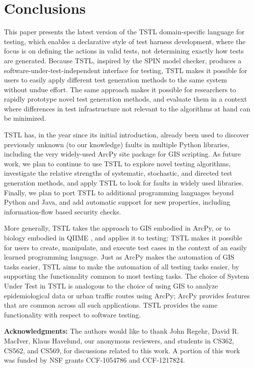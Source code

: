 \section{Conclusions}
\label{sec:conclusion}

This paper presents the latest version of the TSTL
\cite{NFM15,ISSTA15,tstl} domain-specific language for testing, which
enables a declarative style of test harness development, where the
focus is on defining the actions in valid tests, not determining
exactly how tests are generated.  Because TSTL, inspired by the SPIN
model checker, produces a software-under-test-independent interface
for testing, TSTL makes it possible for users to easily apply
different test generation methods to the same system without undue
effort.  The same approach makes it possible for researchers to rapidly prototype novel test generation
methods, and evaluate them in a context where differences in test
infrastructure not relevant to the algorithms at hand can be minimized.

TSTL has, in the year since its initial introduction,
already been used to discover previously unknown (to our knowledge)
faults in multiple Python libraries, including the very widely-used
ArcPy site package for GIS scripting. 
As future work, we plan to continue to use TSTL to explore novel
testing algorithms, investigate the relative strengths of systematic,
stochastic, and directed test generation methods, and apply TSTL to
look for faults in widely used libraries.  Finally, we plan to
port TSTL to additional
programming languages beyond Python and Java, and add automatic
support for new properties, including
information-flow based security checks.

More generally, TSTL takes the approach to GIS embodied in ArcPy, or
to biology embodied in QIIME \cite{QIIME}, and applies it to testing:  TSTL
makes it possible for users to create, manipulate, and execute test
cases in the context of an easily learned programming language.  Just
as ArcPy makes the automation of GIS tasks easier, TSTL aims to make
the automation of all testing tasks easier, by supporting the
functionality common to most testing tasks.  The choice of System
Under Test in TSTL is analogous to the choice of using GIS to analyze
epidemiological data or urban traffic routes using ArcPy; ArcPy
provides features that are common across all such applications.  TSTL
provides the same functionality with respect to software testing.

{\bf Acknowledgments:} The authors would like to thank John Regehr,
David R. MacIver, Klaus Havelund, our anonymous reviewers, and
students in CS362, CS562, and CS569, for discussions related to this work.
A portion of this work was funded by NSF grants CCF-1054786 and
CCF-1217824.
